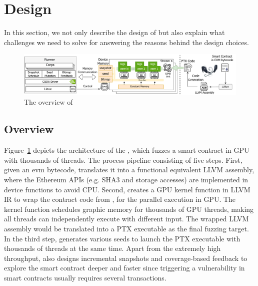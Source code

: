 \section{Design}
In this section, we not only describe the design of  {\tool} but also explain what challenges we need to solve for answering the reasons behind the design choices.  

\begin{figure}[t]
\centerline{\includegraphics[width=\textwidth]{images/GFL-overview.drawio.pdf}}
\caption{The overview of {\tool}}
\vspace{-0.1in}
\label{fig:overview}
\end{figure}


\subsection{Overview}
Figure~\ref{fig:overview} depicts the architecture of the {\tool}, which fuzzes a smart contract in GPU with thousands of threads.  
%
The process pipeline consisting of five steps. 
%
First, given an evm bytecode, {\translator} translates it into a functional equivalent LLVM assembly, where the Ethereum APIs (e.g. SHA3 and storage accesses) are implemented in device functions to avoid CPU.
%
Second, {\wrapper} creates a GPU kernel function in LLVM IR to wrap the contract code from {\translator}, for the parallel execution in GPU. The kernel function schedules graphic memory for thousands of GPU threads, making all threads can independently execute with different input. The wrapped LLVM assembly would be translated into a PTX executable as the final fuzzing target. 
%
In the third step, {\runner} generates various seeds to launch the PTX executable with thousands of threads at the same time. Apart from the extremely high throughput, {\runner} also designs incremental snapshots and coverage-based feedback to explore the smart contract deeper and faster since triggering a vulnerability in smart contracts usually requires several transactions\cite{}. 

